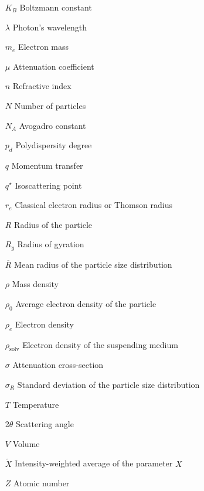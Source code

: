 \begin{itemize}
        \item[$K_B$] Boltzmann constant
        \item[$\lambda$] Photon's wavelength  
        \item[$m_e$] Electron mass
        \item[$\mu$] Attenuation coefficient
        \item[$n$] Refractive index        
        \item[$N$] Number of particles
        \item[$N_A$] Avogadro constant
        \item[$p_d$] Polydispersity degree
        \item[$q$] Momentum transfer 
        \item[$q^{\star}$] Isoscattering point
        \item[$r_e$] Classical electron radius or Thomson radius         
        \item[$R$] Radius of the particle 
        \item[$R_g$] Radius of gyration 
        \item[$\overline{R}$] Mean radius of the particle size distribution
        \item[$\rho$] Mass density        
        \item[$\rho_0$] Average electron density of the particle
        \item[$\rho_e$] Electron density
        \item[$\rho_{\text{solv}}$] Electron density of the suspending medium
        \item[$\sigma$] Attenuation cross-section
        \item[$\sigma_R$] Standard deviation of the particle size distribution
        \item[$T$] Temperature  
        \item[2$\theta$] Scattering angle
        \item[$V$] Volume
        \item[$\tilde X$] Intensity-weighted average of the parameter $X$
        \item[$Z$] Atomic number

\end{itemize}

\cleardoublepage
